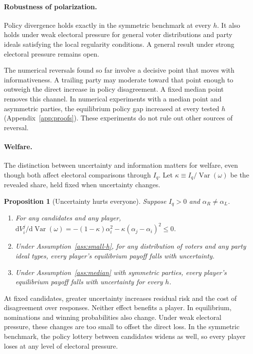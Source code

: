 \documentclass[12pt,letterpaper]{article}
\newtheorem{proposition}{Proposition}
\begin{document}
\paragraph{Robustness of polarization.}\label{sec:general-G}
Policy divergence holds exactly in the symmetric benchmark at every $h$. It also holds under weak electoral pressure for general voter distributions and party ideals satisfying the local regularity conditions. A general result under strong electoral pressure remains open.

The numerical reversals found so far involve a decisive point that moves with informativeness. A trailing party may moderate toward that point enough to outweigh the direct increase in policy disagreement. A fixed median point removes this channel. In numerical experiments with a median point and asymmetric parties, the equilibrium policy gap increased at every tested $h$ (Appendix~\ref{app:proofs}). These experiments do not rule out other sources of reversal.

\paragraph{Welfare.}
The distinction between uncertainty and information matters for welfare, even though both affect electoral comparisons through $I_q$. Let $\kappa\equiv I_q/\operatorname{Var}(\omega)$ be the revealed share, held fixed when uncertainty changes.

\begin{proposition}[Uncertainty hurts everyone]\label{prop:welfare-unc}
Suppose $I_q>0$ and $\alpha_R\ne\alpha_L$.
\begin{enumerate}
  \item[(a)] For any candidates and any player, $\mathrm{d}V_i^j/\mathrm{d}\operatorname{Var}(\omega)=-(1-\kappa)\alpha_i^2-\kappa(\alpha_j-\alpha_i)^2\le0$.
  \item[(b)] Under Assumption~\ref{ass:small-h}, for any distribution of voters and any party ideal types, every player's equilibrium payoff falls with uncertainty.
  \item[(c)] Under Assumption~\ref{ass:median} with symmetric parties, every player's equilibrium payoff falls with uncertainty for every $h$.
\end{enumerate}
\end{proposition}

At fixed candidates, greater uncertainty increases residual risk and the cost of disagreement over responses. Neither effect benefits a player. In equilibrium, nominations and winning probabilities also change. Under weak electoral pressure, these changes are too small to offset the direct loss. In the symmetric benchmark, the policy lottery between candidates widens as well, so every player loses at any level of electoral pressure.
\end{document}
